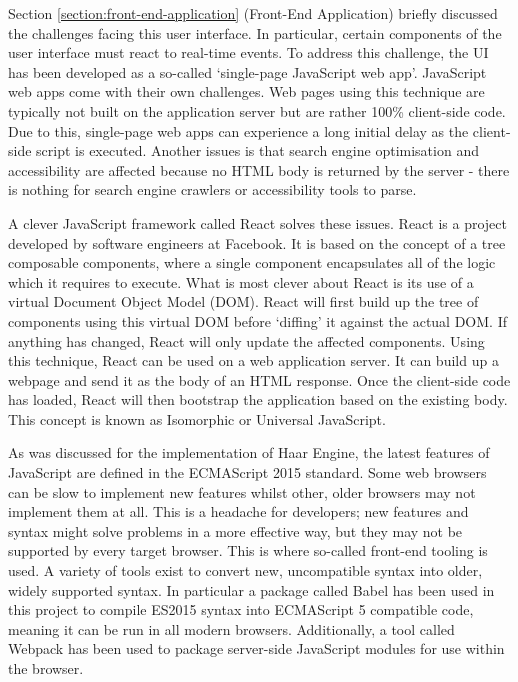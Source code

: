       Section \ref{section:front-end-application} (Front-End Application) briefly discussed the challenges facing this user interface. In particular, certain components of the user interface must react to real-time events. To address this challenge, the UI has been developed as a so-called `single-page JavaScript web app'. JavaScript web apps come with their own challenges. Web pages using this technique are typically not built on the application server but are rather 100\% client-side code. Due to this, single-page web apps can experience a long initial delay as the client-side script is executed. Another issues is that search engine optimisation and accessibility are affected because no HTML body is returned by the server - there is nothing for search engine crawlers or accessibility tools to parse.

      A clever JavaScript framework called React solves these issues. React is a project developed by software engineers at Facebook. It is based on the concept of a tree composable components, where a single component encapsulates all of the logic which it requires to execute. What is most clever about React is its use of a virtual Document Object Model (DOM). React will first build up the tree of components using this virtual DOM before `diffing' it against the actual DOM. If anything has changed, React will only update the affected components. Using this technique, React can be used on a web application server. It can build up a webpage and send it as the body of an HTML response. Once the client-side code has loaded, React will then bootstrap the application based on the existing body. This concept is known as Isomorphic or Universal JavaScript.

      As was discussed for the implementation of Haar Engine, the latest features of JavaScript are defined in the ECMAScript 2015 standard. Some web browsers can be slow to implement new features whilst other, older browsers may not implement them at all. This is a headache for developers; new features and syntax might solve problems in a more effective way, but they may not be supported by every target browser. This is where so-called front-end tooling is used. A variety of tools exist to convert new, uncompatible syntax into older, widely supported syntax. In particular a package called Babel has been used in this project to compile ES2015 syntax into ECMAScript 5 compatible code, meaning it can be run in all modern browsers. Additionally, a tool called Webpack has been used to package server-side JavaScript modules for use within the browser.

